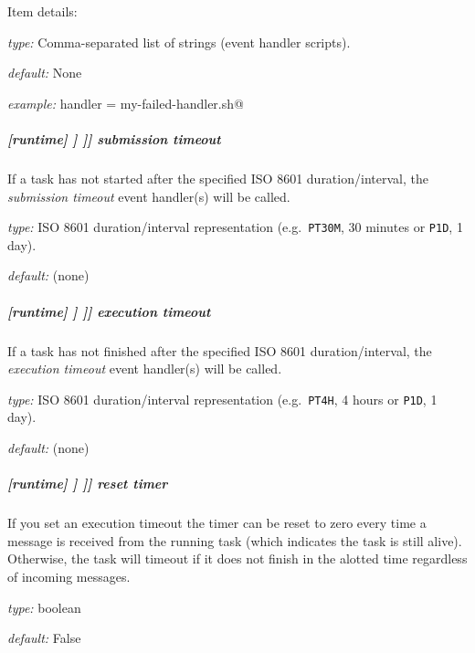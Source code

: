 Item details:
\begin{myitemize}
    \item {\em type:} Comma-separated list of strings (event handler scripts).
    \item {\em default:} None
    \item {\em example:} \lstinline@failed handler = my-failed-handler.sh@
\end{myitemize}

\subparagraph[submission timeout]{[runtime] \textrightarrow [[\_\_NAME\_\_]] \textrightarrow [[[events]]] \textrightarrow submission timeout}
\label{runtime-event-hooks-submission-timeout}

If a task has not started after the specified ISO 8601 duration/interval, the
{\em submission timeout} event handler(s) will be called.
\begin{myitemize}
    \item {\em type:} ISO 8601 duration/interval representation (e.g.\ 
 \lstinline=PT30M=, 30 minutes or \lstinline=P1D=, 1 day).
    \item {\em default:} (none)
\end{myitemize}

\subparagraph[execution timeout]{[runtime] \textrightarrow [[\_\_NAME\_\_]] \textrightarrow [[[events]]] \textrightarrow execution timeout}
\label{runtime-event-hooks-execution-timeout}

If a task has not finished after the specified ISO 8601 duration/interval, the
{\em execution timeout} event handler(s) will be called.
\begin{myitemize}
    \item {\em type:} ISO 8601 duration/interval representation (e.g.\ 
 \lstinline=PT4H=, 4 hours or \lstinline=P1D=, 1 day).
    \item {\em default:} (none)
\end{myitemize}

\subparagraph[reset timer]{[runtime] \textrightarrow [[\_\_NAME\_\_]] \textrightarrow [[[events]]] \textrightarrow reset timer}
\label{runtime-event-hooks-reset-timer}

If you set an execution timeout the timer can be reset to zero every
time a message is received from the running task (which indicates the
task is still alive).  Otherwise, the task will timeout if it does not
finish in the alotted time regardless of incoming messages.

\begin{myitemize}
\item {\em type:} boolean
\item {\em default:} False
\end{myitemize}

